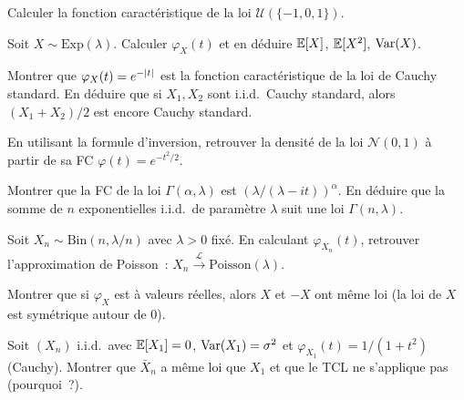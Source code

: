 \begin{exercice}
Calculer la fonction caract\'eristique de la loi $\mathcal{U}(\{-1, 0, 1\})$.
\end{exercice}

\begin{exercice}
Soit $X \sim \text{Exp}(\lambda)$. Calculer $\varphi_X(t)$ et en d\'eduire
$\mathbb{E}[X]$, $\mathbb{E}[X^2]$, $\mathrm{Var}(X)$.
\end{exercice}

\begin{exercice}
Montrer que $\varphi_X(t) = e^{-\left| t \right|}$ est la fonction caract\'eristique de la
loi de Cauchy standard. En d\'eduire que si $X_1, X_2$ sont i.i.d.\ Cauchy standard,
alors $(X_1+X_2)/2$ est encore Cauchy standard.
\end{exercice}

\begin{exercice}
En utilisant la formule d'inversion, retrouver la densit\'e de la loi $\mathcal{N}(0,1)$
\`a partir de sa FC $\varphi(t) = e^{-t^2/2}$.
\end{exercice}

\begin{exercice}
Montrer que la FC de la loi $\Gamma(\alpha, \lambda)$ est
$(\lambda/(\lambda - it))^\alpha$. En d\'eduire que la somme de $n$ exponentielles
i.i.d.\ de param\`etre $\lambda$ suit une loi $\Gamma(n, \lambda)$.
\end{exercice}

\begin{exercice}
Soit $X_n \sim \text{Bin}(n, \lambda/n)$ avec $\lambda > 0$ fix\'e. En calculant
$\varphi_{X_n}(t)$, retrouver l'approximation de Poisson~:
$X_n \xrightarrow{\mathcal{L}} \text{Poisson}(\lambda)$.
\end{exercice}

\begin{exercice}
Montrer que si $\varphi_X$ est \`a valeurs r\'eelles, alors $X$ et $-X$ ont m\^eme
loi (la loi de $X$ est sym\'etrique autour de 0).
\end{exercice}

\begin{exercice}
Soit $(X_n)$ i.i.d.\ avec $\mathbb{E}[X_1] = 0$, $\mathrm{Var}(X_1) = \sigma^2$ et
$\varphi_{X_1}(t) = 1/(1+t^2)$ (Cauchy). Montrer que $\bar{X}_n$ a m\^eme loi
que $X_1$ et que le TCL ne s'applique pas (pourquoi~?).
\end{exercice}
